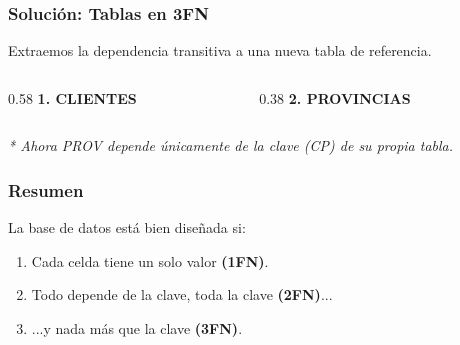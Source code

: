 \documentclass{beamer}
\begin{document}
\begin{frame}
  \frametitle{Solución: Tablas en 3FN}
  Extraemos la dependencia transitiva a una nueva tabla de referencia.

  \begin{columns}[t]
    \begin{column}{0.58\textwidth}
      \textbf{1. CLIENTES}
    \end{column}

    \begin{column}{0.38\textwidth}
      \textbf{2. PROVINCIAS}
      \vspace{1em}
    \end{column}
  \end{columns}
  \footnotesize{\textit{* Ahora PROV depende únicamente de la clave (CP) de su propia tabla.}}
\end{frame}


\begin{frame}
  \frametitle{Resumen}
  \begin{center}
      La base de datos está bien diseñada si:
      \vspace{1em}
      
      \begin{enumerate}
          \item Cada celda tiene un solo valor \textbf{(1FN)}.
          \item Todo depende de la clave, toda la clave \textbf{(2FN)}...
          \item ...y nada más que la clave \textbf{(3FN)}.
      \end{enumerate}
  \end{center}
\end{frame}
\end{document}
